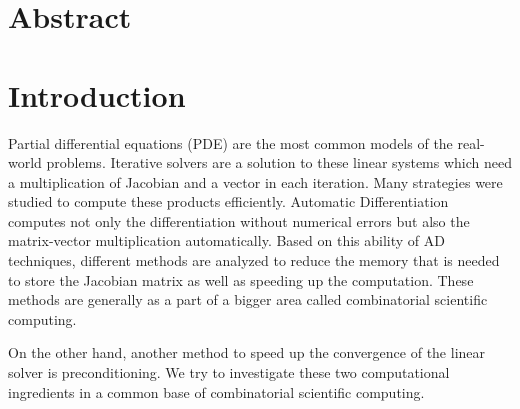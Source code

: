 \documentclass[12pt, oneside]{book}
\begin{document}
\tableofcontents
\newpage
\chapter*{Abstract}
\chapter{Introduction}
Partial differential equations (PDE) are the most common models of the real-world problems.
Iterative solvers are a solution to these linear systems which need a multiplication
 of Jacobian and a vector in each iteration. 
Many strategies were studied to compute these products efficiently.
Automatic Differentiation~\cite{Griewank2008EDP,Rall1981ADT} 
computes not only the differentiation without numerical errors but also the
matrix-vector multiplication automatically. 
Based on this ability of AD techniques, different methods are analyzed to 
reduce the memory that is needed to store the Jacobian matrix as well as
speeding up the computation. These methods are generally as a part of 
a bigger area called combinatorial scientific computing.

On the other hand, another method to speed up the convergence of the linear solver
is preconditioning. We try to investigate these two computational ingredients
in a common base of combinatorial scientific computing. 
\end{document}
